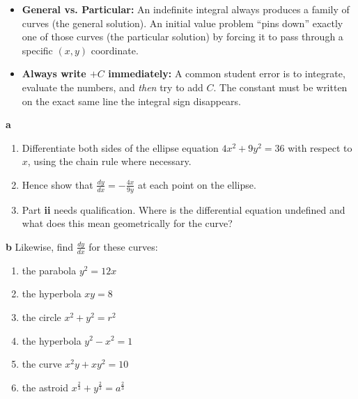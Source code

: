 \begin{takeaways}
\begin{itemize}[leftmargin=*]
    \item \textbf{General vs. Particular:} An indefinite integral always produces a family of curves (the general solution). An initial value problem ``pins down'' exactly one of those curves (the particular solution) by forcing it to pass through a specific $(x, y)$ coordinate.
    \item \textbf{Always write $+C$ immediately:} A common student error is to integrate, evaluate the numbers, and \textit{then} try to add $C$. The constant must be written on the exact same line the integral sign disappears.
\end{itemize}
\end{takeaways}

\begin{problem}
\textbf{a} 
\begin{enumerate}
    \item[\textbf{i}] Differentiate both sides of the ellipse equation $4x^2 + 9y^2 = 36$ with respect to $x$, using the chain rule where necessary.
    \item[\textbf{ii}] Hence show that $\frac{dy}{dx} = -\frac{4x}{9y}$ at each point on the ellipse.
    \item[\textbf{iii}] Part \textbf{ii} needs qualification. Where is the differential equation undefined and what does this mean geometrically for the curve?
\end{enumerate}

\textbf{b} Likewise, find $\frac{dy}{dx}$ for these curves:
\begin{enumerate}
    \item[\textbf{i}] the parabola $y^2 = 12x$
    \item[\textbf{ii}] the hyperbola $xy = 8$
    \item[\textbf{iii}] the circle $x^2 + y^2 = r^2$
    \item[\textbf{iv}] the hyperbola $y^2 - x^2 = 1$
    \item[\textbf{v}] the curve $x^2y + xy^2 = 10$
    \item[\textbf{vi}] the astroid $x^{\frac{2}{3}} + y^{\frac{2}{3}} = a^{\frac{2}{3}}$
\end{enumerate}
\end{problem}

